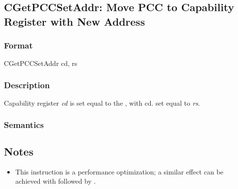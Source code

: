 \clearpage
{}
{}
\subsection*{CGetPCCSetAddr: Move PCC to Capability Register with New Address}

\subsubsection*{Format}

CGetPCCSetAddr cd, rs

\begin{center}
\end{center}

\subsubsection*{Description}

Capability register \emph{cd} is set equal to the \PCC{}, with
cd.\caddr{} set equal to \emph{rs}.

\subsubsection*{Semantics}


\subsection*{Notes}

\begin{itemize}
\item
This instruction is a performance optimization; a similar effect can be
achieved with  followed by .
\end{itemize}
